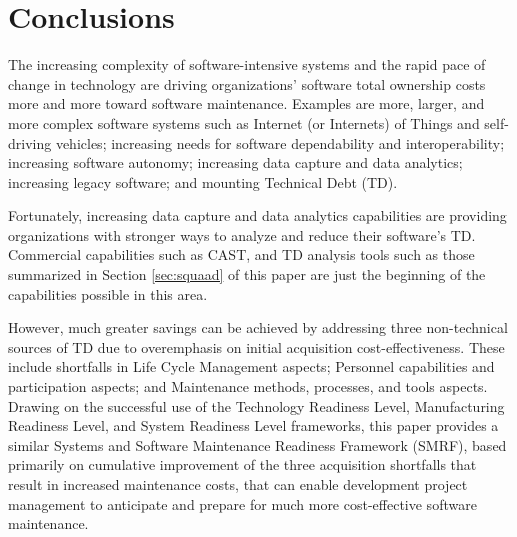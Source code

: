\section{Conclusions}
\label{sec:conclusion}
The increasing complexity of software-intensive systems and the rapid pace of change in technology are driving organizations' software total ownership costs more and more toward software maintenance. Examples are more, larger, and more complex software systems such as Internet (or Internets) of Things and self-driving vehicles; increasing needs for software dependability and interoperability; increasing software autonomy; increasing data capture and data analytics; increasing legacy software; and mounting Technical Debt (TD).

Fortunately, increasing data capture and data analytics capabilities are  providing organizations with stronger ways to analyze and reduce their software's TD. Commercial capabilities such as CAST, and TD analysis tools such as those summarized in Section \ref{sec:squaad} of this paper are just the beginning of the capabilities possible in this area.

However, much greater savings can be achieved by addressing three non-technical sources of TD due to overemphasis  on initial acquisition cost-effectiveness. These include shortfalls  in Life Cycle Management aspects; Personnel capabilities and participation aspects; and Maintenance methods, processes, and tools aspects. Drawing on the successful use of the Technology Readiness Level, Manufacturing Readiness Level, and System Readiness Level frameworks, this paper provides a similar Systems and Software Maintenance Readiness Framework (SMRF), based primarily on cumulative improvement of the three acquisition shortfalls that result in increased maintenance costs, that can enable development project management to anticipate and prepare for much more cost-effective software maintenance.